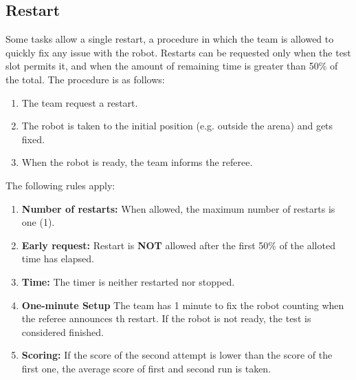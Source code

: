 \subsection{Restart}
\label{rule:restart}
Some tasks allow a single restart, a procedure in which the team is allowed to quickly fix any issue with the robot.
Restarts can be requested only when the test slot permits it, and when the amount of remaining time is greater than 50\% of the total.
The procedure is as follows:

\begin{enumerate}
	\item The team request a restart.
	\item The robot is taken to the initial position (e.g. outside the arena) and gets fixed.
	\item When the robot is ready, the team informs the referee.
\end{enumerate}

The following rules apply:
\begin{enumerate}
	\item \textbf{Number of restarts:} When allowed, the maximum number of restarts is one (1).

	\item \textbf{Early request:} Restart is \textbf{NOT} allowed after the first 50\% of the alloted time has elapsed.

	\item \textbf{Time:} The timer is neither restarted nor stopped.

	\item \textbf{One-minute Setup} The team has 1 minute to fix the robot counting when the referee announces th restart.
	If the robot is not ready, the test is considered finished.

	\item \textbf{Scoring:} If the score of the second attempt is lower than the score of the first one, the average score of first and second run is taken.
\end{enumerate}

